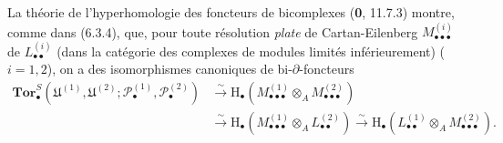 \begin{env}[6.6.6]
La théorie de l'hyperhomologie des foncteurs de bicomplexes
(\textbf{0}, 11.7.3) montre, comme dans (6.3.4), que, pour toute
résolution \emph{plate} de Cartan-Eilenberg $M_{\bullet\bullet\bullet}^{(i)}$ de
$L_{\bullet\bullet}^{(i)}$ (dans la catégorie des complexes de modules
limités inférieurement) ($i=1,2$), on a des isomorphismes canoniques de
bi-$\partial$-foncteurs
\[
\begin{aligned}
  \mathbf{Tor}_\bullet^S
  (\mathfrak U^{(1)},\mathfrak U^{(2)};
   \mathscr P_\bullet^{(1)},\mathscr P_\bullet^{(2)})
  &\xrightarrow{\sim}
   \mathrm H_\bullet
   (M_{\bullet\bullet\bullet}^{(1)}\otimes_A M_{\bullet\bullet\bullet}^{(2)})\\
  &\xrightarrow{\sim}
   \mathrm H_\bullet
   (M_{\bullet\bullet\bullet}^{(1)}\otimes_A L_{\bullet\bullet}^{(2)})
   \xrightarrow{\sim}
   \mathrm H_\bullet
   (L_{\bullet\bullet}^{(1)}\otimes_A M_{\bullet\bullet\bullet}^{(2)}).
\end{aligned}
\tag{6.6.6.1}\label{III.6.6.6.1.fr}
\]
\end{env}

